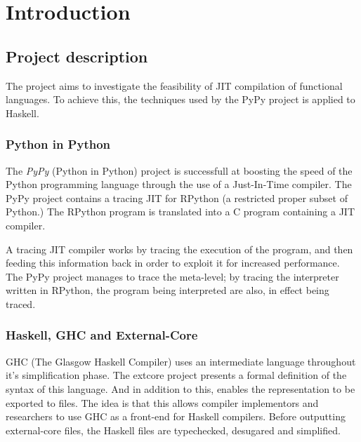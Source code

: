 

\chapter{Introduction}


\section{Project description}

The project aims to investigate the feasibility of JIT compilation of functional 
languages. To achieve this, the techniques used by the PyPy project is applied to 
Haskell.


\subsection{Python in Python}

The \emph{PyPy} (Python in Python) project is successfull at boosting the speed 
of the Python programming language
through the use of a Just-In-Time compiler. The PyPy project contains a tracing JIT for 
RPython (a restricted proper subset of Python.) The RPython program is translated 
into a C program containing a JIT compiler. 

A tracing JIT compiler works by tracing the execution of the program, and then feeding
this information back in order to exploit it for increased performance. The PyPy 
project manages to trace the meta-level; by tracing the interpreter written in RPython,
the program being interpreted are also, in effect being traced.



\subsection{Haskell, GHC and External-Core}

GHC (The Glasgow Haskell Compiler) uses an intermediate language throughout it's 
simplification phase. The extcore project presents a formal definition of the syntax 
of this language. And in addition to this, enables the representation to be exported 
to files. The idea is that this allows compiler implementors and researchers to use GHC
as a front-end for Haskell compilers. Before outputting external-core files,
the Haskell files are typechecked, desugared and simplified. \cite{tolmach2010ghc}

\begin{comment}
The linkcore project implements a linker for core programs, i.e. it transforms
a single Haskell module into a single closed external-core module. In addition to
this, since the linker requires external-core representation of the ghc-libraries,
it also contains instructions on how to create these. 
\end{comment}




